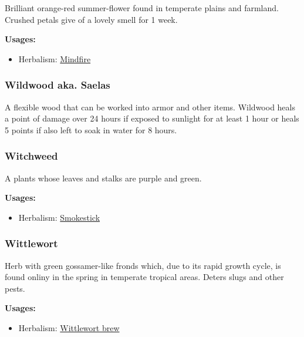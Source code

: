 Brilliant orange-red summer-flower found in temperate plains and farmland. Crushed petals give of a lovely smell for 1 week.

\vspace{5mm}

\textbf{Usages:}

\begin{itemize}[noitemsep]
\item[] Herbalism: \hyperref[Mindfire]{Mindfire}
\end{itemize}

\subsubsection{Wildwood aka. Saelas}

A flexible wood that can be worked into armor and other items. Wildwood heals a point of damage over 24 hours if exposed to sunlight for at least 1 hour or heals 5 points if also left to soak in water for 8 hours.

\subsubsection{Witchweed}
\label{Witchweed}

A plants whose leaves and stalks are purple and green.

\vspace{5mm}

\textbf{Usages:}

\begin{itemize}[noitemsep]
\item[] Herbalism: \hyperref[Smokestick]{Smokestick}
\end{itemize}

\subsubsection{Wittlewort}
\label{Wittlewort}

Herb with green gossamer-like fronds which, due to its rapid growth cycle, is found onliny in the spring in temperate tropical areas. Deters slugs and other pests.

\vspace{5mm}

\textbf{Usages:}

\begin{itemize}[noitemsep]
\item[] Herbalism: \hyperref[Wittlewort brew]{Wittlewort brew}
\end{itemize}

